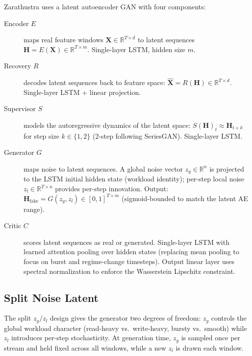 \documentclass[10pt,twocolumn]{article}
\newcommand{\sys}{Zarathustra\xspace}
\begin{document}
\sys uses a latent autoencoder GAN with four components:

\begin{description}
  \item[Encoder $E$] maps real feature windows
    $\mathbf{X} \in \mathbb{R}^{T \times d}$ to latent sequences
    $\mathbf{H} = E(\mathbf{X}) \in \mathbb{R}^{T \times m}$.
    Single-layer LSTM, hidden size $m$.

  \item[Recovery $R$] decodes latent sequences back to feature space:
    $\hat{\mathbf{X}} = R(\mathbf{H}) \in \mathbb{R}^{T \times d}$.
    Single-layer LSTM + linear projection.

  \item[Supervisor $S$] models the autoregressive dynamics of the
    latent space: $S(\mathbf{H})_{t} \approx \mathbf{H}_{t+k}$
    for step size $k \in \{1, 2\}$ (2-step following SeriesGAN).
    Single-layer LSTM.

  \item[Generator $G$] maps noise to latent sequences.
    A global noise vector $z_g \in \mathbb{R}^{n}$ is projected to the
    LSTM initial hidden state (workload identity); per-step local noise
    $z_l \in \mathbb{R}^{T \times n}$ provides per-step innovation.
    Output: $\mathbf{H}_{\text{fake}} = G(z_g, z_l) \in [0,1]^{T \times m}$
    (sigmoid-bounded to match the latent AE range).

  \item[Critic $C$] scores latent sequences as real or generated.
    Single-layer LSTM with learned attention pooling over hidden states
    (replacing mean pooling to focus on burst and regime-change
    timesteps).  Output linear layer uses spectral normalization to
    enforce the Wasserstein Lipschitz constraint.
\end{description}

\subsection{Split Noise Latent}

The split $z_g / z_l$ design gives the generator two degrees of freedom:
$z_g$ controls the global workload character (read-heavy vs.\ write-heavy,
bursty vs.\ smooth) while $z_l$ introduces per-step stochasticity.
At generation time, $z_g$ is sampled once per stream and held fixed
across all windows, while a new $z_l$ is drawn each window.


\end{document}
